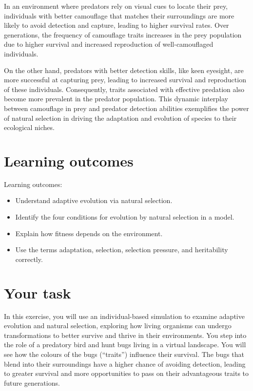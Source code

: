 \documentclass[
  a4paper]{book}
\providecommand{\tightlist}{%
  \setlength{\itemsep}{0pt}\setlength{\parskip}{0pt}}
\begin{document}
In an environment where predators rely on visual cues to locate their prey, individuals with better camouflage that matches their surroundings are more likely to avoid detection and capture, leading to higher survival rates. Over generations, the frequency of camouflage traits increases in the prey population due to higher survival and increased reproduction of well-camouflaged individuals.

On the other hand, predators with better detection skills, like keen eyesight, are more successful at capturing prey, leading to increased survival and reproduction of these individuals. Consequently, traits associated with effective predation also become more prevalent in the predator population. This dynamic interplay between camouflage in prey and predator detection abilities exemplifies the power of natural selection in driving the adaptation and evolution of species to their ecological niches.

\section{Learning outcomes}\label{learning-outcomes-1}

Learning outcomes:

\begin{itemize}
\tightlist
\item
  Understand adaptive evolution via natural selection.
\item
  Identify the four conditions for evolution by natural selection in a model.
\item
  Explain how fitness depends on the environment.
\item
  Use the terms adaptation, selection, selection pressure, and heritability correctly.
\end{itemize}

\section{Your task}\label{your-task-1}

In this exercise, you will use an individual-based simulation to examine adaptive evolution and natural selection, exploring how living organisms can undergo transformations to better survive and thrive in their environments. You step into the role of a predatory bird and hunt bugs living in a virtual landscape. You will see how the colours of the bugs (``traits'') influence their survival. The bugs that blend into their surroundings have a higher chance of avoiding detection, leading to greater survival and more opportunities to pass on their advantageous traits to future generations.
\end{document}
